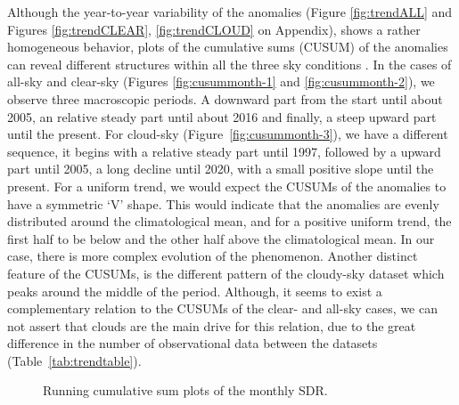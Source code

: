 \documentclass[applsci,article,submit,moreauthors,pdftex]{Definitions/mdpi}
\begin{document}
Although the year-to-year variability of the anomalies (Figure
\ref{fig:trendALL} and Figures \ref{fig:trendCLEAR},
\ref{fig:trendCLOUD} on Appendix), shows a rather homogeneous behavior,
plots of the cumulative sums (CUSUM) of the anomalies can reveal
different structures within all the three sky conditions
\citep{Regier2019}. In the cases of all-sky and clear-sky (Figures
\ref{fig:cusummonth-1} and \ref{fig:cusummonth-2}), we observe three
macroscopic periods. A downward part from the start until about 2005, an
relative steady part until about 2016 and finally, a steep upward part
until the present. For cloud-sky (Figure~\ref{fig:cusummonth-3}), we
have a different sequence, it begins with a relative steady part until
1997, followed by a upward part until 2005, a long decline until 2020,
with a small positive slope until the present. For a uniform trend, we
would expect the CUSUMs of the anomalies to have a symmetric `V' shape.
This would indicate that the anomalies are evenly distributed around the
climatological mean, and for a positive uniform trend, the first half to
be below and the other half above the climatological mean. In our case,
there is more complex evolution of the phenomenon. Another distinct
feature of the CUSUMs, is the different pattern of the cloudy-sky
dataset which peaks around the middle of the period. Although, it seems
to exist a complementary relation to the CUSUMs of the clear- and
all-sky cases, we can not assert that clouds are the main drive for this
relation, due to the great difference in the number of observational
data between the datasets (Table~\ref{tab:trendtable}).

\begin{figure}[h!]

{\centering {}

}

\caption{Running cumulative sum plots of the monthly SDR.}\label{fig:cusummonth}
\end{figure}
\end{document}
